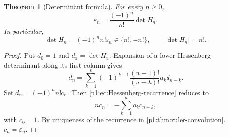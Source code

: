 \documentclass[11pt,oneside]{article}
\numberwithin{equation}{section}
\newtheorem{theorem}{Theorem}[section]
\theoremstyle{definition}
\theoremstyle{remark}
\newcommand{\eps}{\varepsilon}
\begin{document}
\begin{theorem}[Determinant formula]
\label{p1:thm:Hessenberg-determinant}
For every \(n\ge0\),
\begin{equation}
  \boxed{
  \eps_n=\frac{(-1)^n}{n!}\det H_n.}
  \label{p1:eq:Hessenberg-determinant}
\end{equation}
In particular,
\begin{equation}
  \det H_n=(-1)^n n!\eps_n\in\{n!,-n!\},
  \qquad
  |\det H_n|=n!.
  \label{p1:eq:Hessenberg-factorial}
\end{equation}
\end{theorem}

\begin{proof}
Put \(d_0=1\) and \(d_n=\det H_n\).  Expansion of a lower Hessenberg
determinant along its first column gives
\begin{equation}
 d_n=\sum_{k=1}^{n}(-1)^{k-1}
     \frac{(n-1)!}{(n-k)!}a_kd_{n-k}.
 \label{p1:eq:Hessenberg-recurrence}
\end{equation}
Set \(d_n=(-1)^nn!c_n\).  Then \eqref{p1:eq:Hessenberg-recurrence} reduces to
\[
 nc_n=-\sum_{k=1}^{n}a_kc_{n-k},
 \]
with \(c_0=1\).  By uniqueness of the recurrence in
\cref{p1:thm:ruler-convolution}, \(c_n=\eps_n\).
\end{proof}
\end{document}
